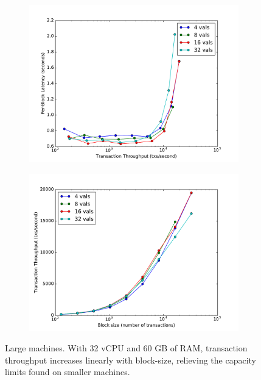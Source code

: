 \begin{figure}[]
	\centering
	\begin{subfigure}{0.8 \textwidth}
		\includegraphics[width=\linewidth,height=\textheight,keepaspectratio]{figures/throughput/large_instances/latency-throughput.pdf}
		\centering
	\end{subfigure}

	\begin{subfigure}{0.8 \textwidth}
		\includegraphics[width=\linewidth,height=\textheight,keepaspectratio]{figures/throughput/large_instances/throughput-blocksize.pdf}
	\end{subfigure}
	\centering
	\caption[Latency-Throughput trade-off in non-faulty global network of large machines]{Large machines.
With 32 vCPU and 60 GB of RAM, transaction throughput increases linearly with block-size, 
relieving the capacity limits found on smaller machines.}
	\label{fig:exp:throughput:large}
\end{figure}

